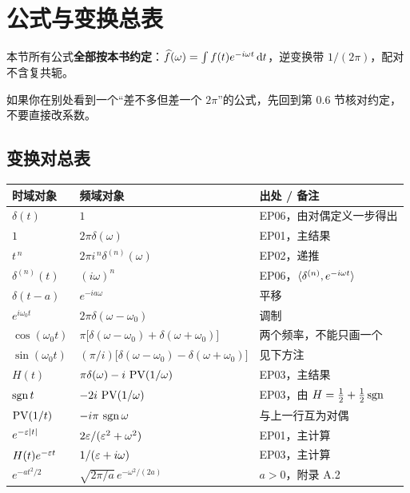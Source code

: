 \appendix

\chapter{公式与变换总表}

\begin{ideabox}[使用说明]
本节所有公式\textbf{全部按本书约定}：$\widehat{f}(\omega)=\int f(t)e^{-i\omega t}\mathop{}\!\mathrm{d} t$，逆变换带 $1/(2\pi)$，配对不含复共轭。

如果你在别处看到一个“差不多但差一个 $2\pi$”的公式，先回到第 0.6 节核对约定，不要直接改系数。
\end{ideabox}

\section{变换对总表}

\begin{center}
\small
\renewcommand{\arraystretch}{1.55}
\begin{tabularx}{\textwidth}{@{}L{4.6cm}L{4.6cm}Y@{}}
\toprule
时域对象 & 频域对象 & 出处 / 备注 \\
\midrule
$\delta(t)$ & $1$ & EP06，由对偶定义一步得出 \\
$1$ & $2\pi\delta(\omega)$ & EP01，主结果 \\
$t^{\,n}$ & $2\pi i^{\,n}\delta^{(n)}(\omega)$ & EP02，递推 \\
$\delta^{(n)}(t)$ & $(i\omega)^{n}$ & EP06，$\langle \delta^{(n)},e^{-i\omega t}\rangle$ \\
$\delta(t-a)$ & $e^{-ia\omega}$ & 平移 \\
$e^{i\omega_0 t}$ & $2\pi\delta(\omega-\omega_0)$ & 调制 \\
$\cos(\omega_0 t)$ & $\pi\big[\delta(\omega-\omega_0)+\delta(\omega+\omega_0)\big]$ & 两个频率，不能只画一个 \\
$\sin(\omega_0 t)$ & $(\pi/i)\big[\delta(\omega-\omega_0)-\delta(\omega+\omega_0)\big]$ & 见下方注 \\
$H(t)$ & $\pi\delta(\omega)-i\,\operatorname{PV}(1/\omega)$ & EP03，主结果 \\
$\operatorname{sgn} t$ & $-2i\,\operatorname{PV}(1/\omega)$ & EP03，由 $H=\frac12+\frac12\operatorname{sgn}$ \\
$\operatorname{PV}(1/t)$ & $-i\pi\,\operatorname{sgn}\omega$ & 与上一行互为对偶 \\
$e^{-\varepsilon|t|}$ & $2\varepsilon/(\varepsilon^{2}+\omega^{2})$ & EP01，主计算 \\
$H(t)e^{-\varepsilon t}$ & $1/(\varepsilon+i\omega)$ & EP03，主计算 \\
$e^{-at^{2}/2}$ & $\sqrt{2\pi/a}\,e^{-\omega^{2}/(2a)}$ & $a>0$，附录 A.2 \\
\bottomrule
\end{tabularx}
\end{center}

